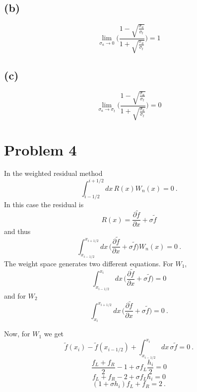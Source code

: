 \documentclass{article}
\begin{document}
\subsection*{(b)}
\begin{equation*}
\boxed{ \lim_{\sigma_a \to 0} \Bigg( \frac{1 - \sqrt{\frac{\sigma_a}{\sigma_t}}}{1 + \sqrt{\frac{\sigma_a}{\sigma_t}}} \Bigg) = 1 }
\end{equation*}

\subsection*{(c)}
\begin{equation*}
\boxed{ \lim_{\sigma_a \to \sigma_t} \Bigg( \frac{1 - \sqrt{\frac{\sigma_a}{\sigma_t}}}{1 + \sqrt{\frac{\sigma_a}{\sigma_t}}} \Bigg) = 0 }
\end{equation*}


\pagebreak

\section*{Problem 4}

In the weighted residual method 
\begin{equation*}
\int_{i-1/2}^{i+1/2} dx \, R(x) W_n(x) = 0 \: .
\end{equation*}
In this case the residual is 
\begin{equation*}
R(x) = \frac{\partial \tilde{f}}{\partial x} + \sigma \tilde{f} 
\end{equation*}
and thus
\begin{equation*}
\int_{x_{i-1/2}}^{x_{i+1/2}} dx \, \Big( \frac{\partial \tilde{f}}{\partial x} + \sigma \tilde{f}  \Big) W_n(x) = 0 \: .
\end{equation*}
The weight space generates two different equations. For $W_1$, 
\begin{equation*}
\int_{x_{i-1/2}}^{x_{i}} dx \, \Big( \frac{\partial \tilde{f}}{\partial x} + \sigma \tilde{f}  \Big) = 0 
\end{equation*}
and for $W_2$
\begin{equation*}
\int_{x_{i}}^{x_{i+1/2}} dx \, \Big( \frac{\partial \tilde{f}}{\partial x} + \sigma \tilde{f}  \Big)  = 0 \: .
\end{equation*}

Now, for $W_1$ we get
\begin{equation*}
\tilde{f} (x_{i}) - \tilde{f} (x_{i-1/2}) + \int_{x_{i-1/2}}^{x_{i}} dx \, \sigma \tilde{f} = 0   \: .
\end{equation*}
\begin{equation*}
\frac{f_L + f_R}{2} - 1 + \sigma f_L \frac{h_i}{2}  = 0 
\end{equation*}
\begin{equation*}
f_L + f_R - 2 + \sigma f_L h_i  = 0 
\end{equation*}
\begin{equation}
\label{eq:W1}
(1 + \sigma h_i) f_L + f_R = 2 \: .
\end{equation}
\end{document}
